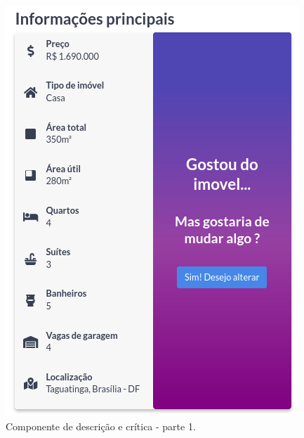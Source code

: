 \begin{figure}[H]
    \centering
    \includegraphics[scale=0.75]{figuras/desenvolvimento/componente_critica.png}
    \caption[Componente de descrição e crítica - parte 1]{Componente de descrição e crítica - parte 1.}
    \label{fig:componente_critica}
\end{figure}

